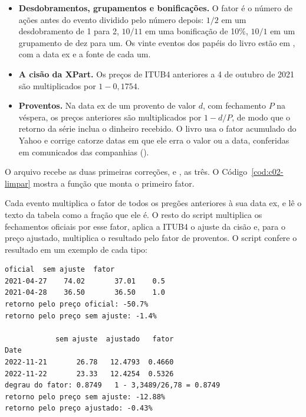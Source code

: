 \begin{itemize}
  \item \textbf{Desdobramentos, grupamentos e bonificações.} O fator é o número de ações antes do evento dividido pelo número depois: $1/2$ em um desdobramento de 1 para 2, $10/11$ em uma bonificação de 10\%, $10/1$ em um grupamento de dez para um. Os vinte eventos dos papéis do livro estão em , com a data ex e a fonte de cada um.
  \item \textbf{A cisão da XPart.} Os preços de ITUB4 anteriores a 4 de outubro de 2021 são multiplicados por $1 - 0,1754$.
  \item \textbf{Proventos.} Na data ex de um provento de valor $d$, com fechamento $P$ na véspera, os preços anteriores são multiplicados por $1 - d/P$, de modo que o retorno da série inclua o dinheiro recebido. O livro usa o fator acumulado do Yahoo e corrige catorze datas em que ele erra o valor ou a data, conferidas em comunicados das companhias ().
\end{itemize}

O arquivo  recebe as duas primeiras correções, e , as três. O Código~\ref{cod:c02-limpar} mostra a função que monta o primeiro fator.



Cada evento multiplica o fator de todos os pregões anteriores à sua data ex, e  lê o texto  da tabela como a fração que ele é. O resto do script multiplica os fechamentos oficiais por esse fator, aplica a ITUB4 o ajuste da cisão e, para o preço ajustado, multiplica o resultado pelo fator de proventos. O script  confere o resultado em um exemplo de cada tipo:

\begin{lstlisting}[style=saida]
            oficial  sem ajuste  fator
2021-04-27    74.02       37.01    0.5
2021-04-28    36.50       36.50    1.0
retorno pelo preço oficial: -50.7%
retorno pelo preço sem ajuste: -1.4%

            sem ajuste  ajustado   fator
Date
2022-11-21       26.78   12.4793  0.4660
2022-11-22       23.33   12.4254  0.5326
degrau do fator: 0.8749   1 - 3,3489/26,78 = 0.8749
retorno pelo preço sem ajuste: -12.88%
retorno pelo preço ajustado: -0.43%
\end{lstlisting}

